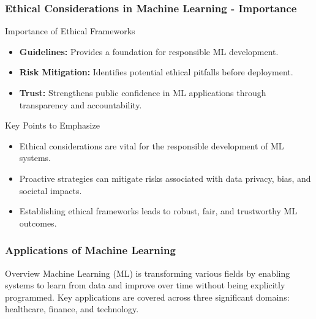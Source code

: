 \documentclass[aspectratio=169]{beamer}
\begin{document}
\begin{frame}[fragile]
    \frametitle{Ethical Considerations in Machine Learning - Importance}
    \begin{block}{Importance of Ethical Frameworks}
        \begin{itemize}
            \item \textbf{Guidelines:} Provides a foundation for responsible ML development.
            \item \textbf{Risk Mitigation:} Identifies potential ethical pitfalls before deployment.
            \item \textbf{Trust:} Strengthens public confidence in ML applications through transparency and accountability.
        \end{itemize}
    \end{block}
    
    \begin{block}{Key Points to Emphasize}
        \begin{itemize}
            \item Ethical considerations are vital for the responsible development of ML systems.
            \item Proactive strategies can mitigate risks associated with data privacy, bias, and societal impacts.
            \item Establishing ethical frameworks leads to robust, fair, and trustworthy ML outcomes.
        \end{itemize}
    \end{block}
\end{frame}

\begin{frame}[fragile]
    \frametitle{Applications of Machine Learning}
    \begin{block}{Overview}
        Machine Learning (ML) is transforming various fields by enabling systems to learn from data and improve over time without being explicitly programmed. Key applications are covered across three significant domains: healthcare, finance, and technology.
    \end{block}
\end{frame}
\end{document}
